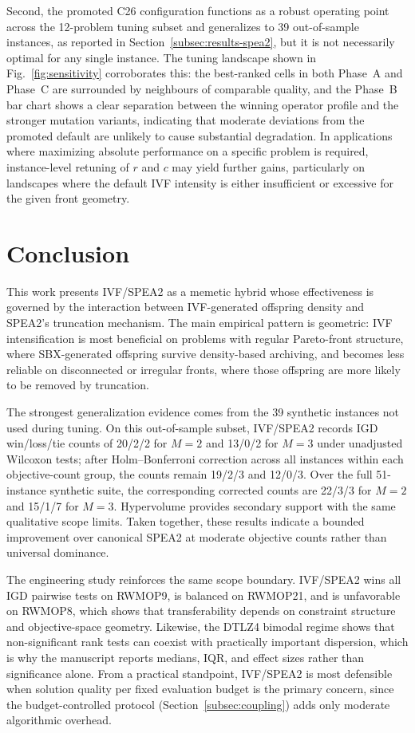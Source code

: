 \documentclass[pdflatex,sn-mathphys-ay]{sn-jnl}%
\theoremstyle{thmstyleone}%
\theoremstyle{thmstyletwo}%
\theoremstyle{thmstylethree}%
\begin{document}
Second, the promoted C26 configuration functions as a robust operating point across the 12-problem tuning subset and generalizes to 39 out-of-sample instances, as reported in Section~\ref{subsec:results-spea2}, but it is not necessarily optimal for any single instance. The tuning landscape shown in Fig.~\ref{fig:sensitivity} corroborates this: the best-ranked cells in both Phase~A and Phase~C are surrounded by neighbours of comparable quality, and the Phase~B bar chart shows a clear separation between the winning operator profile and the stronger mutation variants, indicating that moderate deviations from the promoted default are unlikely to cause substantial degradation. In applications where maximizing absolute performance on a specific problem is required, instance-level retuning of $r$ and $c$ may yield further gains, particularly on landscapes where the default IVF intensity is either insufficient or excessive for the given front geometry.


\section{Conclusion}\label{sec:conclusion}

This work presents IVF/SPEA2 as a memetic hybrid whose effectiveness is governed by the interaction between IVF-generated offspring density and SPEA2's truncation mechanism. The main empirical pattern is geometric: IVF intensification is most beneficial on problems with regular Pareto-front structure, where SBX-generated offspring survive density-based archiving, and becomes less reliable on disconnected or irregular fronts, where those offspring are more likely to be removed by truncation.

The strongest generalization evidence comes from the 39 synthetic instances not used during tuning. On this out-of-sample subset, IVF/SPEA2 records IGD win/loss/tie counts of 20/2/2 for $M{=}2$ and 13/0/2 for $M{=}3$ under unadjusted Wilcoxon tests; after Holm--Bonferroni correction across all instances within each objective-count group, the counts remain 19/2/3 and 12/0/3. Over the full 51-instance synthetic suite, the corresponding corrected counts are 22/3/3 for $M{=}2$ and 15/1/7 for $M{=}3$. Hypervolume provides secondary support with the same qualitative scope limits. Taken together, these results indicate a bounded improvement over canonical SPEA2 at moderate objective counts rather than universal dominance.

The engineering study reinforces the same scope boundary. IVF/SPEA2 wins all IGD pairwise tests on RWMOP9, is balanced on RWMOP21, and is unfavorable on RWMOP8, which shows that transferability depends on constraint structure and objective-space geometry. Likewise, the DTLZ4 bimodal regime shows that non-significant rank tests can coexist with practically important dispersion, which is why the manuscript reports medians, IQR, and effect sizes rather than significance alone. From a practical standpoint, IVF/SPEA2 is most defensible when solution quality per fixed evaluation budget is the primary concern, since the budget-controlled protocol (Section~\ref{subsec:coupling}) adds only moderate algorithmic overhead.
\end{document}
